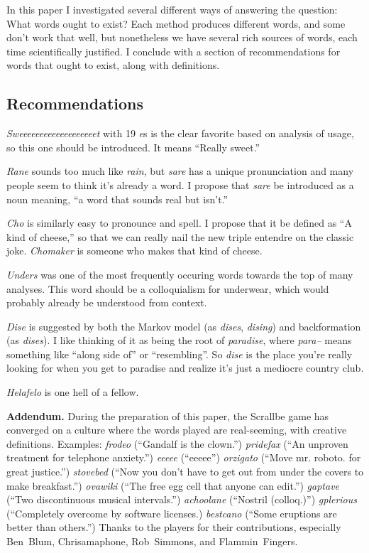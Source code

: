 \documentclass[twocolumn]{article}
\begin{document}
In this paper I investigated several different ways of answering the
question: What words ought to exist? Each method produces different
words, and some don't work that well, but nonetheless we have several
rich sources of words, each time scientifically justified. I conclude
with a section of recommendations for words that ought to exist, along
with definitions.

\subsection{Recommendations}

{\it Sweeeeeeeeeeeeeeeeeeet} with 19 {\it e}s is the clear favorite
based on analysis of usage, so this one should be introduced. It means
``Really sweet.''

{\it Rane} sounds too much like {\it rain}, but {\it sare} has a
unique pronunciation and many people seem to think it's already a
word. I propose that {\it sare} be introduced as a noun meaning, ``a
word that sounds real but isn't.''

{\it Cho} is similarly easy to pronounce and spell. I propose that it
be defined as ``A kind of cheese,'' so that we can really nail the new
triple entendre on the classic joke. {\it Chomaker} is someone who
makes that kind of cheese.

{\it Unders} was one of the most frequently occuring words towards the
top of many analyses. This word should be a colloquialism for
underwear, which would probably already be understood from context.

{\it Dise} is suggested by both the Markov model (as {\it dises}, {\it
  dising}) and backformation (as {\it dises}). I like thinking of it
as being the root of {\it paradise}, where {\it para--} means
something like ``along side of'' or ``resembling''. So {\it dise} is
the place you're really looking for when you get to paradise and
realize it's just a mediocre country club.

{\it Helafelo} is one hell of a fellow.

\medskip
{\bf Addendum.} During the preparation of this paper, the Scrallbe
game has converged on a culture where the words played are real-seeming,
with creative definitions. Examples: {\it frodeo} (``Gandalf is the
clown.'') {\it pridefax} (``An unproven treatment for telephone
anxiety.'') {\it eeeee} (``eeeee'') {\it orzigato} (``Move mr. roboto.
for great justice.'') {\it stovebed} (``Now you don't have to get out
from under the covers to make breakfast.'') {\it ovawiki} (``The free
egg cell that anyone can edit.'') {\it gaptave} (``Two discontinuous
musical intervals.'') {\it achoolane} (``Nostril (colloq.)'') {\it
  gplerious} (``Completely overcome by software licenses.) {\it
  bestcano} (``Some eruptions are better than others.'') Thanks to the
players for their contributions, especially Ben~Blum, Chrisamaphone,
Rob~Simmons, and Flammin~Fingers.
\end{document}
